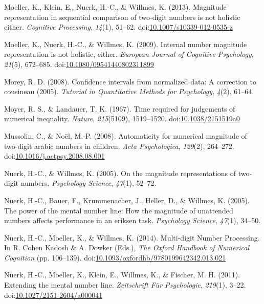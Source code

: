 \documentclass[english,man]{apa6}
\theoremstyle{definition}
\theoremstyle{definition}
\theoremstyle{definition}
\theoremstyle{remark}
\begin{document}
\hypertarget{ref-moeller2013}{}
Moeller, K., Klein, E., Nuerk, H.-C., \& Willmes, K. (2013). Magnitude
representation in sequential comparison of two-digit numbers is not
holistic either. \emph{Cognitive Processing}, \emph{14}(1), 51--62.
doi:\href{https://doi.org/10.1007/s10339-012-0535-z}{10.1007/s10339-012-0535-z}

\hypertarget{ref-moeller2009}{}
Moeller, K., Nuerk, H.-C., \& Willmes, K. (2009). Internal number
magnitude representation is not holistic, either. \emph{European Journal
of Cognitive Psychology}, \emph{21}(5), 672--685.
doi:\href{https://doi.org/10.1080/09541440802311899}{10.1080/09541440802311899}

\hypertarget{ref-morey2008}{}
Morey, R. D. (2008). Confidence intervals from normalized data: A
correction to cousineau (2005). \emph{Tutorial in Quantitative Methods
for Psychology}, \emph{4}(2), 61--64.

\hypertarget{ref-moyer1967}{}
Moyer, R. S., \& Landauer, T. K. (1967). Time required for judgements of
numerical inequality. \emph{Nature}, \emph{215}(5109), 1519--1520.
doi:\href{https://doi.org/10.1038/2151519a0}{10.1038/2151519a0}

\hypertarget{ref-mussolin2008}{}
Mussolin, C., \& Noël, M.-P. (2008). Automaticity for numerical
magnitude of two-digit arabic numbers in children. \emph{Acta
Psychologica}, \emph{129}(2), 264--272.
doi:\href{https://doi.org/10.1016/j.actpsy.2008.08.001}{10.1016/j.actpsy.2008.08.001}

\hypertarget{ref-nuerk2005}{}
Nuerk, H.-C., \& Willmes, K. (2005). On the magnitude representations of
two-digit numbers. \emph{Psychology Science}, \emph{47}(1), 52--72.

\hypertarget{ref-nuerk2005power}{}
Nuerk, H.-C., Bauer, F., Krummenacher, J., Heller, D., \& Willmes, K.
(2005). The power of the mental number line: How the magnitude of
unattended numbers affects performance in an eriksen task.
\emph{Psychology Science}, \emph{47}(1), 34--50.

\hypertarget{ref-nuerk2014chapter}{}
Nuerk, H.-C., Moeller, K., \& Willmes, K. (2014). Multi-digit Number
Processing. In R. Cohen Kadosh \& A. Dowker (Eds.), \emph{The Oxford
Handbook of Numerical Cognition} (pp. 106--139).
doi:\href{https://doi.org/10.1093/oxfordhb/9780199642342.013.021}{10.1093/oxfordhb/9780199642342.013.021}

\hypertarget{ref-nuerk2011}{}
Nuerk, H.-C., Moeller, K., Klein, E., Willmes, K., \& Fischer, M. H.
(2011). Extending the mental number line. \emph{Zeitschrift Für
Psychologie}, \emph{219}(1), 3--22.
doi:\href{https://doi.org/10.1027/2151-2604/a000041}{10.1027/2151-2604/a000041}
\end{document}
